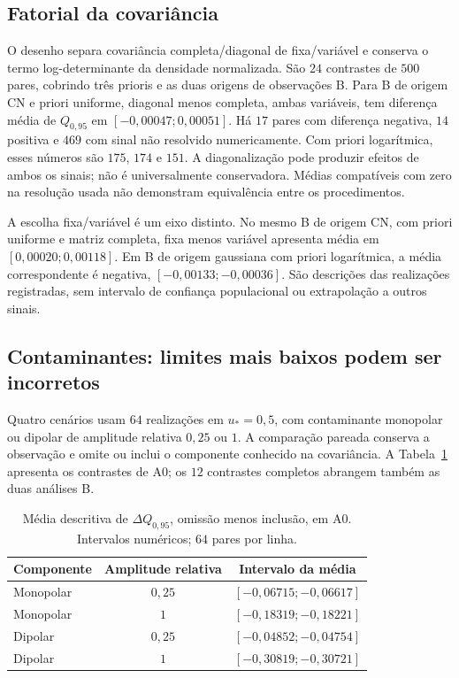 \subsection{Fatorial da covariância}

O desenho separa covariância completa/diagonal de fixa/variável e conserva
o termo log-determinante da densidade normalizada. São \(24\) contrastes
de \(500\) pares, cobrindo três prioris e as duas origens de observações B.
Para B de origem CN e priori uniforme, diagonal menos completa, ambas
variáveis, tem diferença média de \(Q_{0,95}\) em
\([-0,00047;0,00051]\). Há \(17\) pares com diferença negativa,
\(14\) positiva e \(469\) com sinal não resolvido numericamente.
Com priori logarítmica, esses números são \(175\), \(174\) e \(151\).
A diagonalização pode produzir efeitos de ambos os sinais; não é
universalmente conservadora. Médias compatíveis com zero na resolução
usada não demonstram equivalência entre os procedimentos.

A escolha fixa/variável é um eixo distinto. No mesmo B de origem CN,
com priori uniforme e matriz completa, fixa menos variável apresenta
média em \([0,00020;0,00118]\). Em B de origem gaussiana com priori
logarítmica, a média correspondente é negativa,
\([-0,00133;-0,00036]\). São descrições das realizações registradas,
sem intervalo de confiança populacional ou extrapolação a outros sinais.

\subsection{Contaminantes: limites mais baixos podem ser incorretos}

Quatro cenários usam \(64\) realizações em \(u_*=0,5\), com
contaminante monopolar ou dipolar de amplitude relativa \(0,25\) ou \(1\).
A comparação pareada conserva a observação e omite ou inclui o componente
conhecido na covariância. A Tabela~\ref{tab:c09-contaminantes-producao}
apresenta os contrastes de A0; os \(12\) contrastes completos abrangem
também as duas análises B.

\begin{table}[htbp]
\centering
\caption{Média descritiva de \(\Delta Q_{0,95}\), omissão menos inclusão,
em A0. Intervalos numéricos; \(64\) pares por linha.}
\label{tab:c09-contaminantes-producao}
\begin{tabular}{lcc}
\hline
Componente & Amplitude relativa & Intervalo da média\\
\hline
Monopolar & \(0,25\) & \([-0,06715;-0,06617]\)\\
Monopolar & \(1\) & \([-0,18319;-0,18221]\)\\
Dipolar & \(0,25\) & \([-0,04852;-0,04754]\)\\
Dipolar & \(1\) & \([-0,30819;-0,30721]\)\\
\hline
\end{tabular}
\end{table}

